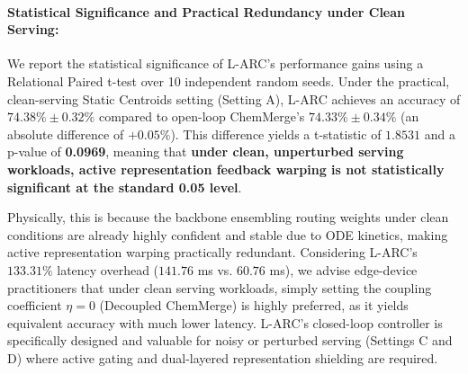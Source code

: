 \paragraph{Statistical Significance and Practical Redundancy under Clean Serving:}
We report the statistical significance of L-ARC's performance gains using a Relational Paired t-test over 10 independent random seeds. Under the practical, clean-serving Static Centroids setting (Setting A), L-ARC achieves an accuracy of $74.38\% \pm 0.32\%$ compared to open-loop ChemMerge's $74.33\% \pm 0.34\%$ (an absolute difference of $+0.05\%$). This difference yields a t-statistic of $1.8531$ and a p-value of \textbf{0.0969}, meaning that \textbf{under clean, unperturbed serving workloads, active representation feedback warping is not statistically significant at the standard 0.05 level}. 

Physically, this is because the backbone ensembling routing weights under clean conditions are already highly confident and stable due to ODE kinetics, making active representation warping practically redundant. Considering L-ARC's $133.31\%$ latency overhead ($141.76$ ms vs. $60.76$ ms), we advise edge-device practitioners that under clean serving workloads, simply setting the coupling coefficient $\eta = 0$ (Decoupled ChemMerge) is highly preferred, as it yields equivalent accuracy with much lower latency. L-ARC's closed-loop controller is specifically designed and valuable for noisy or perturbed serving (Settings C and D) where active gating and dual-layered representation shielding are required.


